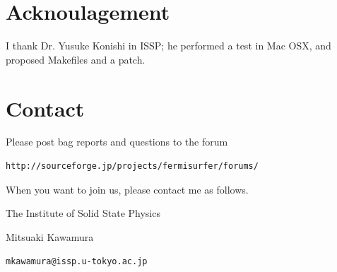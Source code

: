 \documentclass[12pt]{article}
\begin{document}
\section{Acknoulagement}

I thank Dr. Yusuke Konishi in ISSP;
he performed a test in Mac OSX,
and proposed Makefiles and a patch.

\section{Contact}

Please post bag reports and questions to the forum
\begin{verbatim}
http://sourceforge.jp/projects/fermisurfer/forums/
\end{verbatim}

When you want to join us, please contact me as follows.

The Institute of Solid State Physics

Mitsuaki Kawamura

\verb|mkawamura@issp.u-tokyo.ac.jp|
\end{document}
